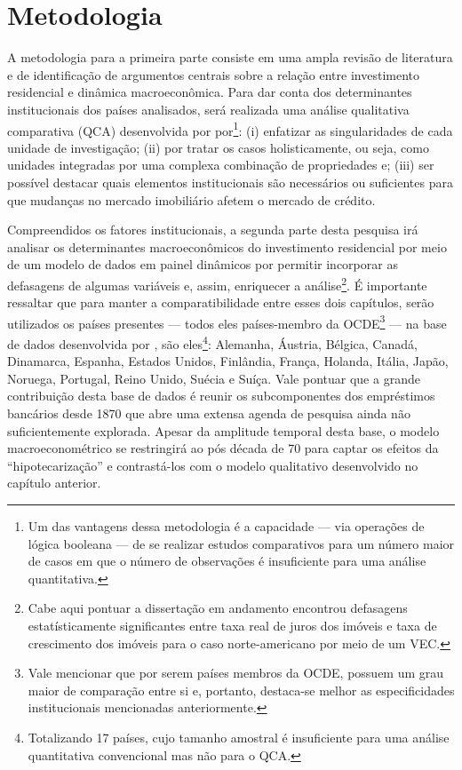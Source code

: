 \section{Metodologia}\label{passos}



A metodologia para a primeira parte consiste em uma ampla revisão de literatura e de identificação de argumentos centrais sobre a relação entre investimento residencial e dinâmica macroeconômica. Para dar conta dos determinantes institucionais dos países analisados, será realizada uma análise qualitativa comparativa (QCA) desenvolvida por \textcite{ragin_comparative_1989} por\footnote{Um das vantagens dessa metodologia é a capacidade --- via operações de lógica booleana --- de se realizar estudos comparativos para um número maior de casos em que o número de observações é insuficiente para uma análise quantitativa.}: (i) enfatizar as singularidades de cada unidade de investigação; (ii) por tratar os casos holisticamente, ou seja, como unidades integradas por uma complexa combinação de propriedades e; (iii) ser possível destacar quais elementos institucionais são necessários ou suficientes para que mudanças no mercado imobiliário afetem o mercado de crédito.

Compreendidos os fatores institucionais, a segunda parte desta pesquisa irá analisar os determinantes macroeconômicos do investimento residencial por meio de um modelo de dados em painel dinâmicos por permitir incorporar as defasagens de algumas variáveis e, assim, enriquecer a análise\footnote{Cabe aqui pontuar a dissertação em andamento encontrou defasagens estatísticamente significantes entre taxa real de juros dos imóveis e taxa de crescimento dos imóveis para o caso norte-americano por meio de um VEC.}.
É importante ressaltar que para manter a comparatibilidade entre esses dois capítulos, serão utilizados os países presentes --- todos eles países-membro da OCDE\footnote{Vale mencionar que por serem países membros da OCDE, possuem um grau maior de comparação entre si e, portanto, destaca-se melhor as especificidades institucionais mencionadas anteriormente.} --- na base de dados desenvolvida por \textcite{jorda_great_2014}, são eles\footnote{Totalizando 17 países, cujo tamanho amostral é insuficiente para uma análise quantitativa convencional mas não para o QCA.}: Alemanha, Áustria, Bélgica, Canadá, Dinamarca, Espanha, Estados Unidos, Finlândia,  França,   Holanda, Itália, Japão,  Noruega, Portugal, Reino Unido, Suécia e Suíça. Vale pontuar que a grande contribuição desta base de dados é reunir os subcomponentes dos empréstimos bancários desde 1870 que abre uma extensa agenda de pesquisa ainda não suficientemente explorada.
Apesar da amplitude temporal desta base, o modelo macroeconométrico se restringirá ao pós década de 70 para captar os efeitos da ``hipotecarização'' e contrastá-los com o modelo qualitativo desenvolvido no capítulo anterior.

